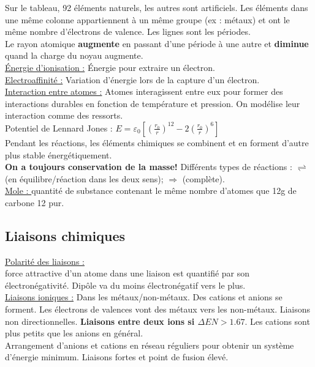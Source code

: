 \documentclass[../main.tex]{subfiles}
\begin{document}
Sur le tableau, 92 éléments naturels, les autres sont artificiels. Les éléments dans une même colonne appartiennent à un même groupe (ex : métaux) et ont le même nombre d'électrons de valence. Les lignes sont les périodes.\\
Le rayon atomique \textbf{augmente} en passant d'une période à une autre et \textbf{diminue} quand la charge du noyau augmente.\\

\quad \underline{Énergie d'ionisation :}
Énergie pour extraire un électron. \\

\quad \underline{Electroaffinité :}
Variation d'énergie lors de la capture d'un électron. \\

\quad \underline{Interaction entre atomes :}
Atomes interagissent entre eux pour former des interactions durables en fonction de température et pression. On modélise leur interaction comme des ressorts. \\
Potentiel de Lennard Jones : $E = \varepsilon_0 [(\frac{r_0}{r})^{12}-2(\frac{r_0}{r})^6]$\\
Pendant les réactions, les éléments chimiques se combinent et en forment d'autre plus stable énergétiquement. \\
\textbf{On a toujours conservation de la masse!} Différents types de réactions : $\rightleftharpoons$ (en équilibre/réaction dans les deux sens); $\Rightarrow$ (complète).\\
\underline{Mole : } quantité de substance contenant le même nombre d'atomes que 12g de carbone 12 pur.\\

\subsection{Liaisons chimiques}


\quad \underline{Polarité des liaisons :}\\
force attractive d'un atome dans une liaison est quantifié par son électronégativité. Dipôle va du moins électronégatif vers le plus.\\

\quad \underline{Liaisons ioniques :}
Dans les métaux/non-métaux. Des cations et anions se forment. Les électrons de valences vont des métaux vers les non-métaux. Liaisons non directionnelles. \textbf{Liaisons entre deux ions si $\Delta EN > 1.67$}. Les cations sont plus petits que les anions en général.\\ 
Arrangement d'anions et cations en réseau réguliers pour obtenir un système d'énergie minimum. Liaisons fortes et point de fusion élevé. \\
\end{document}
